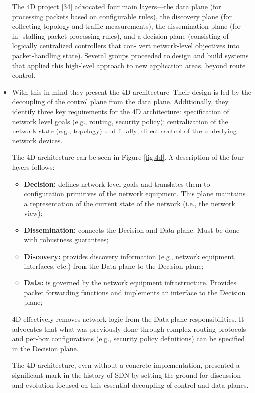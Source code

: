 \begin{itemize}
The 4D project [34] advocated four main layers—the data plane (for processing packets based on configurable rules), the discovery plane (for collecting topology and traffic measurements), the dissemination plane (for in- stalling packet-processing rules), and a decision plane (consisting of logically centralized controllers that con- vert network-level objectives into packet-handling state). Several groups proceeded to design and build systems that applied this high-level approach to new application areas, beyond route control.


\item  With this in mind they present the  4D architecture. Their  design is led by the
decoupling of the control plane from the data plane. Additionally, they
identify three key requirements for the 4D architecture: specification of  network level goals (e.g., routing,
security policy);  centralization of the network state (e.g.,
topology) and finally; direct control of the underlying network
devices.

The 4D architecture can be seen
in Figure \ref{fig:4d}. A description of the four layers
follows: 


\begin{itemize}
\item[] \textbf{Decision:}  defines network-level goals and 
  translates them to configuration primitives of the network
  equipment. This plane maintains a representation of the current state of the network (i.e., the network view); 
\item[] \textbf{Dissemination:}  connects the Decision and Data plane. Must be
  done with robustness guarantees; 
\item[] \textbf{Discovery:} provides discovery information (e.g., network
  equipment, interfaces, etc.) from the Data plane to the Decision plane; 
\item[] \textbf{Data:}  is governed by the network equipment
  infrastructure. Provides packet forwarding functions and implements
  an interface to the Decision plane;  
\end{itemize}

4D effectively removes network logic  from the Data plane
responsibilities. It advocates that what was previously done through complex
routing protocols and per-box configurations (e.g., security policy
definitions)  can be specified in the Decision plane. 

The 4D architecture, even without a concrete implementation, 
presented a significant mark in the history of SDN by setting the
ground for discussion and evolution focused on this essential
decoupling of control and data planes.  



\end{itemize}
